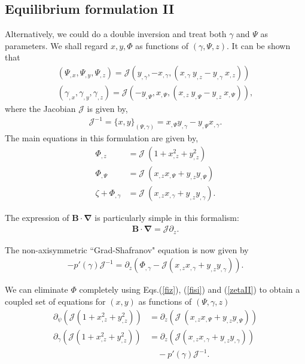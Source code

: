 \documentclass[aip,pop,reprint]{revtex4-1}
\newcommand*{\B}{\bm{B}}
\newcommand*{\Jac}{\mathscr{J}}
\newcommand*{\dl}{\bm{\nabla}}
\newcommand*{\xcg}{x_{,\gamma}}
\newcommand*{\xcz}{x_{,z}}
\newcommand*{\xcsi}{x_{,\Psi}}
\newcommand*{\ycg}{y_{,\gamma}}
\newcommand*{\ycz}{y_{,z}}
\newcommand*{\ycsi}{y_{,\Psi}}
\begin{document}
\subsection{Equilibrium formulation II}
Alternatively, we could do a double inversion and treat both $\gamma$ and $\Psi$ as parameters. We shall regard $x,y,\Phi$ as functions of $(\gamma,\Psi,z)$. It can be shown that
\begin{align*}
(\Psi_{,x},\Psi_{,y},\Psi_{,z})=\Jac \left(\ycg,-\xcg,(\xcg\:\ycz -\ycg\:\xcz)\right) \nonumber\\
(\gamma_{,x},\gamma_{,y},\gamma_{,z})=\Jac \left(-\ycsi,\xcsi,(\xcz\:\ycsi -\ycz\:\xcsi)\right) ,
\end{align*}
where the Jacobian $\Jac$ is given by,
\begin{align}
\Jac^{-1}=\{x,y\}_{(\Psi,\gamma)}= x_{,\Psi}y_{,\gamma}-y_{,\Psi}x_{,\gamma} \label{JacII}.
\end{align}
The main equations in this formulation are given by,
 \begin{subequations}
 \begin{align}
 \Phi_{,z}&= \Jac\:(1+x_{,z}^2+y_{,z}^2) \label{fiz}\\
 \Phi_{,\Psi}&= \Jac\:(x_{,z}x_{,\Psi}+y_{,z}y_{,\Psi})\label{fisi}\\
 \zeta +\Phi_{,\gamma}&= \Jac\:(x_{,z}x_{,\gamma}+ y_{,z}y_{,\gamma}).
 \label{zetaII}
 \end{align}
 \end{subequations}

The expression of $\B\cdot \dl$ is particularly simple in this formalism:
\begin{align}
\B\cdot \dl = \Jac \partial_z .\label{BDII}
\end{align} 


The non-axisymmetric ``Grad-Shafranov" equation is now given by
\begin{align}
-p'(\gamma)\Jac^{-1}=\partial_z \left( \Phi_{,\gamma} -\Jac(x_{,z}x_{,\gamma}+y_{,z}y_{,\gamma}) \right). \label{GSII}
\end{align}

We can eliminate $\Phi$ completely using Eqs.(\ref{fiz}), (\ref{fisi}) and (\ref{zetaII}) to obtain a coupled set of equations for $(x,y)$ as functions of $(\Psi,\gamma,z)$
\begin{subequations}
\begin{align}
\partial_\psi(\Jac(1+x_{,z}^2+y_{,z}^2))&= \partial_z( \Jac\:(x_{,z}x_{,\Psi}+y_{,z}y_{,\Psi})) \label{xyeqn}\\
\partial_\gamma \left(\Jac(1+x_{,z}^2+y_{,z}^2)\right)&= \partial_z \left( \Jac(x_{,z}x_{,\gamma}+y_{,z}y_{,\gamma}) \right)\label{GSxy}\\
& \quad -p'(\gamma)\Jac^{-1} . \nonumber
\end{align}
\end{subequations}
\end{document}
